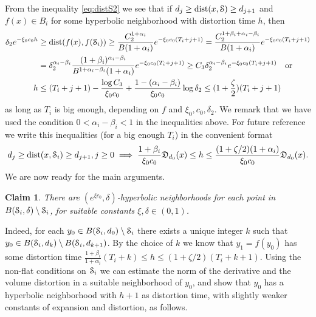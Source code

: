 \documentclass[reqno,12pt,a4paper]{amsart}
\theoremstyle{plain}
\newtheorem{claim}[theorem]{Claim}
\theoremstyle{definition}
\begin{document}
  From the inequality \eqref{eq:distS2} we see that if
  $d_j\ge{\operatorname{dist}}(x,{\EuScript{S}})\ge d_{j+1}$ and $f(x)\in B_i$ for some
  hyperbolic neighborhood with distortion time $h$, then
  \begin{align*}
    \delta_2 e^{-\xi_0 c_0 h}
    &\ge
    {\operatorname{dist}}(f(x),f({\EuScript{S}}_i))
    \ge
    \frac{C_2^{1+\alpha_i}}{B(1+\alpha_i)}
    e^{ - \xi_0 c_0 (T_i+j+1)}
    =
    \frac{C_2^{1+\beta_i+\alpha_i-\beta_i}}{B(1+\alpha_i)}
    e^{ - \xi_0 c_0 (T_i+j+1)}
    \\
    &=
    \delta_2^{\alpha_i-\beta_i}
    \frac{(1+\beta_i)^{\alpha_i-\beta_i}}
    {B^{1+\alpha_i-\beta_i}(1+\alpha_i)}
    e^{ - \xi_0 c_0 (T_i+j+1)}
    \ge
    C_3 \delta_2^{\alpha_i-\beta_i} e^{- \xi_0 c_0 (T_i+j+1)}
    \quad \text{or}
    \\
    h
    &\le
    (T_i+j+1)
    - \frac{\log C_3}{\xi_0 c_0}
    +\frac{1-(\alpha_i-\beta_i)}{\xi_0 c_0}\log\delta_2
    \le
    (1+\frac\zeta2)(T_i+j+1)
  \end{align*}
  as long as $T_i$ is big enough, depending on $f$ and
  $\xi_0,c_0,\delta_2$. We remark that we have used the
  condition $0<\alpha_i-\beta_i<1$ in the inequalities
  above.  For future reference we write this inequalities
  (for a big enough $T_i$) in the convenient format
  \begin{align}
    \label{eq:distS3}
   d_j\ge{\operatorname{dist}}(x,{\EuScript{S}}_i)\ge d_{j+1} , j\ge0
   \implies
   \frac{1+\beta_i}{\xi_0 c_0}{{\mathfrak D}}_{d_0}(x)\le h\le
   \frac{(1+\zeta/2)(1+\alpha_i)}{\xi_0 c_0}{{\mathfrak D}}_{d_0}(x).
  \end{align}
  We are now ready for the main arguments.

  \begin{claim}
    \label{claim:a}
    There are $(e^{\xi c_0},\delta)$-hyperbolic
    neighborhoods for each point in
    $B({\EuScript{S}}_i,\delta)\setminus{\EuScript{S}}_i$, for suitable constants
    $\xi,\delta\in(0,1)$.
  \end{claim}

  Indeed, for each $y_0\in B({\EuScript{S}}_i,d_0)\setminus{\EuScript{S}}_i$ there
  exists a unique integer $k$ such that $y_0\in
  B({\EuScript{S}}_i,d_k)\setminus B({\EuScript{S}}_i,d_{k+1})$. By the choice of
  $k$ we know that $y_1=f(y_0)$ has some distortion time
  $\frac{1+\beta_i}{1+\alpha_i}(T_i+k) \le h \le
  (1+\zeta/2)(T_i+k+1)$. Using the non-flat conditions on
  ${\EuScript{S}}_i$ we can estimate the norm of the derivative and the
  volume distortion in a suitable neighborhood of $y_0$, and
  show that $y_0$ has a hyperbolic neighborhood with $h+1$
  as distortion time, with slightly weaker constants of
  expansion and distortion, as follows.
\end{document}
